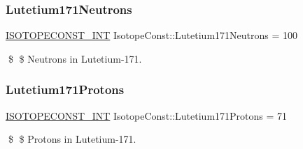 \subsubsection{\texorpdfstring{Lutetium171\+Neutrons}{Lutetium171Neutrons}}
{\footnotesize\ttfamily \mbox{\hyperlink{group___isotope_const-_macros_ga5f18360b3e99483a35c32d789e62621c}{I\+S\+O\+T\+O\+P\+E\+C\+O\+N\+S\+T\+\_\+\+I\+NT}} Isotope\+Const\+::\+Lutetium171\+Neutrons = 100}

\$ \$ Neutrons in Lutetium-\/171. \mbox{\label{group___isotope_const-_lutetium-_lu171_gae869fe471494ebae4092dbd28f7ceaad}} 
\subsubsection{\texorpdfstring{Lutetium171\+Protons}{Lutetium171Protons}}
{\footnotesize\ttfamily \mbox{\hyperlink{group___isotope_const-_macros_ga5f18360b3e99483a35c32d789e62621c}{I\+S\+O\+T\+O\+P\+E\+C\+O\+N\+S\+T\+\_\+\+I\+NT}} Isotope\+Const\+::\+Lutetium171\+Protons = 71}

\$ \$ Protons in Lutetium-\/171. 